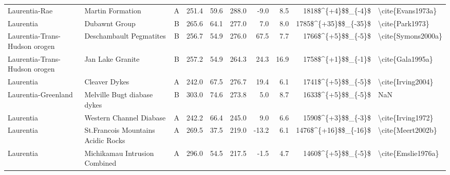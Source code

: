 \begin{longtable}{p{1 in}p{1 in}rrrrrrr}
                 Laurentia-Rae &                                   Martin Formation &      A &     251.4 &      59.6 & 288.0 &  -9.0 &       8.5 &     1818\$\textasciicircum \{+4\}\$\$\_\{-4\}\$ &                                  \textbackslash cite\{Evans1973a\} \\
                     Laurentia &                                      Dubawnt Group &      B &     265.6 &      64.1 & 277.0 &   7.0 &       8.0 &   1785\$\textasciicircum \{+35\}\$\$\_\{-35\}\$ &                                    \textbackslash cite\{Park1973\} \\
 Laurentia-Trans-Hudson orogen &                            Deschambault Pegmatites &      B &     256.7 &      54.9 & 276.0 &  67.5 &       7.7 &     1766\$\textasciicircum \{+5\}\$\$\_\{-5\}\$ &                                 \textbackslash cite\{Symons2000a\} \\
 Laurentia-Trans-Hudson orogen &                                   Jan Lake Granite &      B &     257.2 &      54.9 & 264.3 &  24.3 &      16.9 &     1758\$\textasciicircum \{+1\}\$\$\_\{-1\}\$ &                                   \textbackslash cite\{Gala1995a\} \\
                     Laurentia &                                      Cleaver Dykes &      A &     242.0 &      67.5 & 276.7 &  19.4 &       6.1 &     1741\$\textasciicircum \{+5\}\$\$\_\{-5\}\$ &                                  \textbackslash cite\{Irving2004\} \\
           Laurentia-Greenland &                        Melville Bugt diabase dykes &      B &     303.0 &      74.6 & 273.8 &   5.0 &       8.7 &     1633\$\textasciicircum \{+5\}\$\$\_\{-5\}\$ &                                                NaN \\
                     Laurentia &                            Western Channel Diabase &      A &     242.2 &      66.4 & 245.0 &   9.0 &       6.6 &     1590\$\textasciicircum \{+3\}\$\$\_\{-3\}\$ &                                  \textbackslash cite\{Irving1972\} \\
                     Laurentia &                 St.Francois Mountains Acidic Rocks &      A &     269.5 &      37.5 & 219.0 & -13.2 &       6.1 &   1476\$\textasciicircum \{+16\}\$\$\_\{-16\}\$ &                                  \textbackslash cite\{Meert2002b\} \\
                     Laurentia &                      Michikamau Intrusion Combined &      A &     296.0 &      54.5 & 217.5 &  -1.5 &       4.7 &     1460\$\textasciicircum \{+5\}\$\$\_\{-5\}\$ &                                 \textbackslash cite\{Emslie1976a\} \\

\end{longtable}
